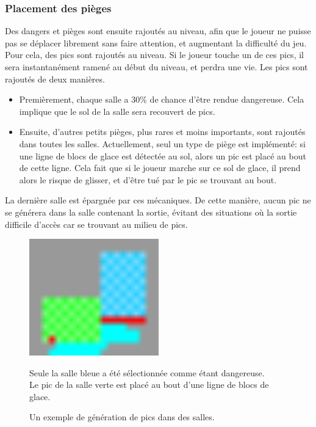 \documentclass[10pt]{report}
\begin{document}
\subsubsection{Placement des pièges}

Des dangers et pièges sont ensuite rajoutés au niveau, afin que le joueur ne puisse pas se déplacer librement sans
faire attention, et augmentant la difficulté du jeu.
Pour cela, des pics sont rajoutés au niveau.
Si le joueur touche un de ces pics, il sera instantanément ramené au début du niveau, et perdra une vie.
Les pics sont rajoutés de deux manières.
\begin{itemize}
  \item Premièrement, chaque salle a 30\% de chance d'être rendue dangereuse.
  Cela implique que le sol de la salle sera recouvert de pics.
  \item Ensuite, d'autres petits pièges, plus rares et moins importants, sont rajoutés dans toutes les salles.
  Actuellement, seul un type de piège est implémenté: si une ligne de blocs de glace est détectée au sol, alors
  un pic est placé au bout de cette ligne.
  Cela fait que si le joueur marche sur ce sol de glace, il prend alors le risque de glisser, et d'être tué par le
  pic se trouvant au bout.
\end{itemize}

La dernière salle est épargnée par ces mécaniques.
De cette manière, aucun pic ne se générera dans la salle contenant la sortie, évitant des situations où la sortie
difficile d'accès car se trouvant au milieu de pics.

  \begin{figure}[H]
  \centering
  \includegraphics[width=0.5\textwidth]{images/ice_spike_trap}
  \caption{Un exemple de génération de pics dans des salles.}
  Seule la salle bleue a été sélectionnée comme étant dangereuse.\\
  Le pic de la salle verte est placé au bout d'une ligne de blocs de glace.
  \label{fig:spike_placement}
\end{figure}
\end{document}
